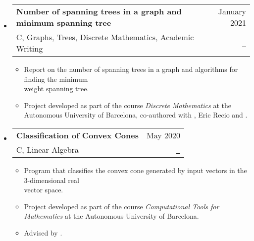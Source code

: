\documentclass[a4paper,11pt]{article}
\makeatletter
\newcommand{\resumeItemListEnd}{\end{itemize}}
\newcommand{\resumeQuadHeading}[4]{
  \item
  \begin{tabular*}{0.96\textwidth}[t]{l@{\extracolsep{\fill}}r}
    \textbf{#1} & \small #2 \\
    \small#3 & \small #4 \\
  \end{tabular*}
}
\newcommand{\resumeHeadingListStart}{
  \begin{itemize}[leftmargin=0.15in, label={}]
}
\newcommand{\resumeHeadingListEnd}{\end{itemize}}
\makeatother
\begin{document}
\begin{itemize}[leftmargin=3em, itemsep=0.1em, topsep=2pt]
\resumeHeadingListStart{}
\resumeQuadHeading{Number of spanning trees in a graph and minimum spanning tree}{January 2021}{C, Graphs, Trees, Discrete Mathematics, Academic Writing}{\href{https://github.com/mathUAB/matematica-discreta/blob/main/Treball/Memoria-escrita/main.pdf}{\faFileTextO \ \graydotuline{{Report \scriptsize (in Catalan)}}}}
\begin{itemize}[leftmargin=3em, itemsep=0.1em, topsep=2pt]
	\item \small Report on the number of spanning trees in a graph and algorithms for finding the minimum\\ weight spanning tree.
	\item \small Project developed as part of the course \textit{Discrete Mathematics} at the Autonomous University of Barcelona, co-authored with \href{https://github.com/Oriolbosg}{}, Eric Recio and \href{https://github.com/carlosala}{}.
\end{itemize}
\resumeItemListEnd{}

\resumeHeadingListStart{}
\resumeQuadHeading{Classification of Convex Cones}{May 2020}{C, Linear Algebra}{\href{https://github.com/mathUAB/informatica/tree/main/Projecte\%20final}{\faGithub \ \graydotuline{Source code}}}
\begin{itemize}[leftmargin=3em, itemsep=0.1em, topsep=2pt]
	\item \small Program that classifies the convex cone generated by input vectors in the 3-dimensional real\\ vector space.
	\item \small Project developed as part of the course \textit{Computational Tools for Mathematics} at the Autonomous University of Barcelona.
	\item \small Advised by \href{https://mat.uab.cat/geoarit/index.php/people?controller=member&view=member&id=1}{}.
\end{itemize}
\resumeItemListEnd{}




\end{itemize}
\end{document}
